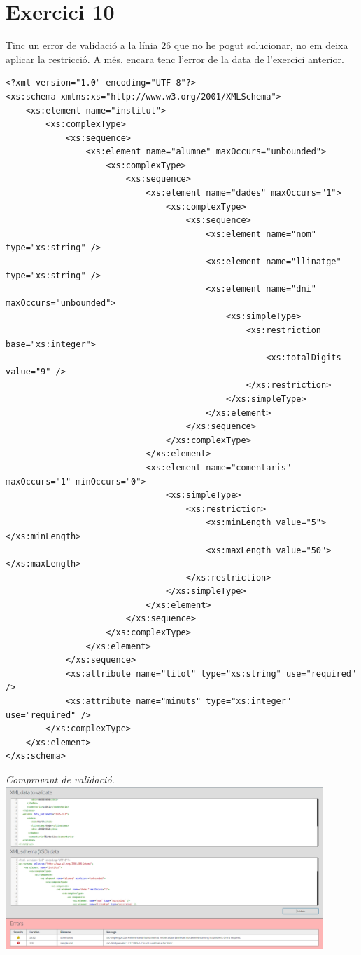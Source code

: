 \documentclass{article}
\begin{document}
\section{Exercici 10}
Tinc un error de validació a la línia 26 que no he pogut solucionar, no em deixa aplicar la restricció. A més, encara tenc l'error de la data de l'exercici anterior.
\begin{verbatim}
<?xml version="1.0" encoding="UTF-8"?>
<xs:schema xmlns:xs="http://www.w3.org/2001/XMLSchema">
    <xs:element name="institut">
        <xs:complexType>
            <xs:sequence>
                <xs:element name="alumne" maxOccurs="unbounded">
                    <xs:complexType>
                        <xs:sequence>
                            <xs:element name="dades" maxOccurs="1">
                                <xs:complexType>
                                    <xs:sequence>
                                        <xs:element name="nom" type="xs:string" />
                                        <xs:element name="llinatge" type="xs:string" />
                                        <xs:element name="dni" maxOccurs="unbounded">
                                            <xs:simpleType>
                                                <xs:restriction base="xs:integer">
                                                    <xs:totalDigits value="9" />
                                                </xs:restriction>
                                            </xs:simpleType>
                                        </xs:element>
                                    </xs:sequence>
                                </xs:complexType>
                            </xs:element>
                            <xs:element name="comentaris" maxOccurs="1" minOccurs="0">
                                <xs:simpleType>
                                    <xs:restriction>
                                        <xs:minLength value="5"></xs:minLength>
                                        <xs:maxLength value="50"></xs:maxLength>
                                    </xs:restriction>
                                </xs:simpleType>
                            </xs:element>
                        </xs:sequence>
                    </xs:complexType>
                </xs:element>
            </xs:sequence>
            <xs:attribute name="titol" type="xs:string" use="required" />
            <xs:attribute name="minuts" type="xs:integer" use="required" />
        </xs:complexType>
    </xs:element>
</xs:schema>
\end{verbatim}
\vspace{1cm}
\begin{center}
    \textit{Comprovant de validació.}
    \includegraphics[width=12cm]{validacio10.png}
\end{center}
\end{document}
